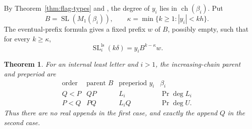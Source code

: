 \documentclass[11pt]{amsart}
\numberwithin{equation}{section}
\newtheorem{theorem}{Theorem}[section]
\theoremstyle{definition}
\DeclareMathOperator{\SL}{SL}
\DeclareMathOperator{\Prj}{Pr}
\DeclareMathOperator{\ch}{ch}
\newcommand{\ls}{\mathrm{ls}}
\begin{document}
By Theorem~\ref{thm:flag-types} and \cite[Lemma~6.11]{ETC}, the degree of $y_i$ lies in $\ch(\beta_i)$. Put
\[
 B=\SL(M_1(\beta_i)),
 \qquad
 \kappa=\min\{k\geq1:|y_i|<kh\}.
\]
The eventual-prefix formula \cite[Lemma~6.45]{ETC} gives a fixed prefix $w$ of $B$, possibly empty, such that for every $k\geq\kappa$,
\begin{equation}\label{eq:eventual-prefix}
 \SL_i^{\ls}(k\delta)=y_iB^{k-\kappa}w.
\end{equation}

\begin{theorem}\label{thm:preperiod}
For an internal least letter and $i>1$, the increasing-chain parent and preperiod are
\begin{equation}\label{eq:preperiod-table}
 \begin{array}{c|c|c|c}
 \text{order}&\text{parent }B&\text{preperiod }y_i&\beta_i\\ \hline
 Q<P&QP&L_i&\Prj\deg L_i\\
 P<Q&PQ&L_iQ&\Prj\deg U.
 \end{array}
\end{equation}
Thus there are no real appends in the first case, and exactly the append $Q$ in the second case.
\end{theorem}
\end{document}
